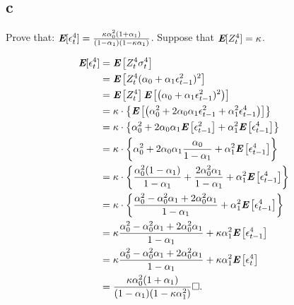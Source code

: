 \subsection{c}
\label{subsection_3_c}
Prove that: $\textbf{\em E}[\epsilon^4_t] = \frac{\kappa\alpha_0^2(1+\alpha_1)}{(1-\alpha_1)(1-\kappa\alpha_1)} $.
Suppose that $\textbf{\em E}[Z_t^4] = \kappa$.

\begin{solution}

\begin{equation}
\begin{aligned}
\textbf{\em E}[\epsilon^4_t] & = \textbf{\em E}\left[Z_t^4\sigma_t^4\right] \\
												 & = \textbf{\em E}\left[Z_t^4(\alpha_0 + \alpha_1 \epsilon_{t-1}^2)^2\right] \\
												 & = \textbf{\em E}\left[Z_t^4\right] \textbf{\em E}\left[\left(\alpha_0 + \alpha_1 \epsilon_{t-1}^2)^2\right)\right] \\
												 & = \kappa \cdot \left\{ \textbf{\em E}\left[\left(\alpha_0^2 
																																	      + 2\alpha_0\alpha_1\epsilon_{t-1}^2 
																																	      + \alpha_1^2\epsilon_{t-1}^4 \right)\right] \right\} \\
												 & = \kappa \cdot \left\{ \alpha_0^2 
																																	      + 2\alpha_0\alpha_1\textbf{\em E}\left[\epsilon_{t-1}^2 \right] 
																																	      + \alpha_1^2\textbf{\em E}\left[\epsilon_{t-1}^4 \right] \right\} \\
										     & = \kappa \cdot \left\{ \alpha_0^2 
																																	      + 2\alpha_0\alpha_1\frac{\alpha_0}{1 - \alpha_1} 
																																	      + \alpha_1^2\textbf{\em E}\left[\epsilon_{t-1}^4 \right] \right\} \\
											   & = \kappa \cdot \left\{ \frac{\alpha_0^2(1 - \alpha_1)}{1 - \alpha_1} 
																																	      + \frac{2\alpha_0^2\alpha_1}{1 - \alpha_1} 
																																	      + \alpha_1^2\textbf{\em E}\left[\epsilon_{t-1}^4 \right] \right\} \\
												& = \kappa \cdot \left\{ \frac{\alpha_0^2 - \alpha_0^2\alpha_1 + 2\alpha_0^2\alpha_1}{1 - \alpha_1} 
																																	      + \alpha_1^2\textbf{\em E}\left[\epsilon_{t-1}^4 \right] \right\} \\
												& = \kappa\frac{\alpha_0^2 - \alpha_0^2\alpha_1 + 2\alpha_0^2\alpha_1}{1 - \alpha_1} 
																																	      + \kappa\alpha_1^2\textbf{\em E}\left[\epsilon_{t-1}^4 \right] \\
												& = \kappa\frac{\alpha_0^2 - \alpha_0^2\alpha_1 + 2\alpha_0^2\alpha_1}{1 - \alpha_1} 
																																	      + \kappa\alpha_1^2\textbf{\em E}\left[\epsilon_{t}^4 \right] \\
												& = \frac{\kappa\alpha_0^2(1 + \alpha_1)}{(1 - \alpha_1)(1 - \kappa\alpha_1^2)} \square.																																	     
\end{aligned}
\end{equation}

\end{solution}


